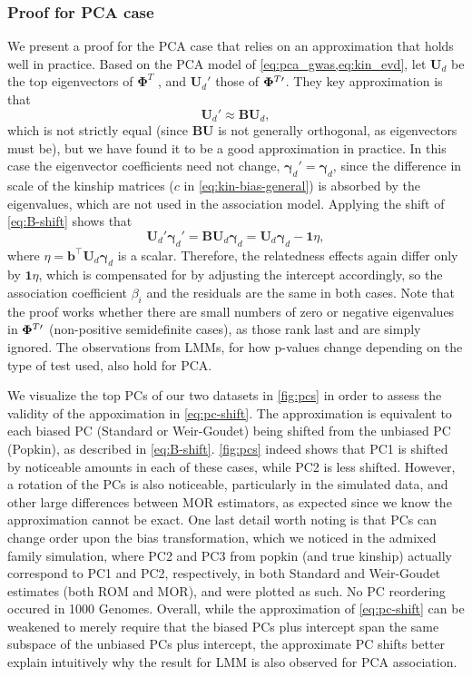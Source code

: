\documentclass[11pt]{article}
\newcommand{\kinMat}[1][T]{%
  \ensuremath{%
    \mathbf{\Phi}^{#1}
  }%
  \xspace%
}%
\newcommand{\kinMatPrime}{%
  \ensuremath{%
    \mathbf{\Phi}^{T\prime}
  }%
  \xspace%
}%
\begin{document}
\subsubsection{Proof for PCA case}

We present a proof for the PCA case that relies on an approximation that holds well in practice.
Based on the PCA model of \cref{eq:pca_gwas,eq:kin_evd}, let $\mathbf{U}_d$ be the top eigenvectors of \kinMat, and $\mathbf{U}_d'$ those of $\kinMatPrime$.
They key approximation is that
\begin{equation}
  \label{eq:pc-shift}
  \mathbf{U}_d' \approx \mathbf{B} \mathbf{U}_d,
\end{equation}
which is not strictly equal (since $\mathbf{B} \mathbf{U}$ is not generally orthogonal, as eigenvectors must be), but we have found it to be a good approximation in practice.
In this case the eigenvector coefficients need not change, $\boldsymbol{\gamma}_d' = \boldsymbol{\gamma}_d$, since the difference in scale of the kinship matrices ($c$ in \cref{eq:kin-bias-general}) is absorbed by the eigenvalues, which are not used in the association model.
Applying the shift of \cref{eq:B-shift} shows that
$$
\mathbf{U}_d' \boldsymbol{\gamma}_d'
=
\mathbf{B} \mathbf{U}_d \boldsymbol{\gamma}_d
=
\mathbf{U}_d \boldsymbol{\gamma}_d - \mathbf{1} \eta,
$$
where
$\eta = \mathbf{b}^\intercal \mathbf{U}_d \boldsymbol{\gamma}_d$
is a scalar.
Therefore, the relatedness effects again differ only by $\mathbf{1} \eta$, which is compensated for by adjusting the intercept accordingly, so the association coefficient $\beta_i$ and the residuals are the same in both cases.
Note that the proof works whether there are small numbers of zero or negative eigenvalues in $\kinMatPrime$ (non-positive semidefinite cases), as those rank last and are simply ignored.
The observations from LMMs, for how p-values change depending on the type of test used, also hold for PCA.

We visualize the top PCs of our two datasets in \cref{fig:pcs} in order to assess the validity of the appoximation in \cref{eq:pc-shift}.
The approximation is equivalent to each biased PC (Standard or Weir-Goudet) being shifted from the unbiased PC (Popkin), as described in \cref{eq:B-shift}.
\cref{fig:pcs} indeed shows that PC1 is shifted by noticeable amounts in each of these cases, while PC2 is less shifted.
However, a rotation of the PCs is also noticeable, particularly in the simulated data, and other large differences between MOR estimators, as expected since we know the approximation cannot be exact.
One last detail worth noting is that PCs can change order upon the bias transformation, which we noticed in the admixed family simulation, where PC2 and PC3 from popkin (and true kinship) actually correspond to PC1 and PC2, respectively, in both Standard and Weir-Goudet estimates (both ROM and MOR), and were plotted as such.
No PC reordering occured in 1000 Genomes.
Overall, while the approximation of \cref{eq:pc-shift} can be weakened to merely require that the biased PCs plus intercept span the same subspace of the unbiased PCs plus intercept, the approximate PC shifts better explain intuitively why the result for LMM is also observed for PCA association.
\end{document}
